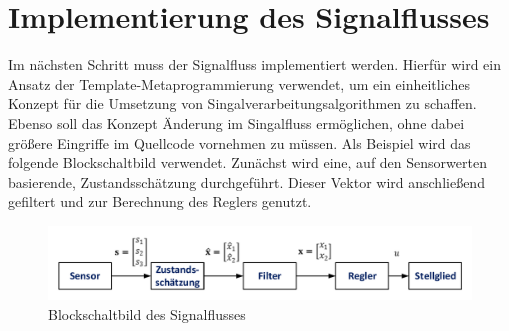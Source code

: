 \section{Implementierung des Signalflusses}
Im nächsten Schritt muss der Signalfluss implementiert werden. Hierfür wird ein Ansatz der Template-Metaprogrammierung verwendet, um ein einheitliches Konzept für die Umsetzung von Singalverarbeitungsalgorithmen zu schaffen. Ebenso soll das Konzept Änderung im Singalfluss ermöglichen, ohne dabei größere Eingriffe im Quellcode vornehmen zu müssen. Als Beispiel wird das folgende Blockschaltbild verwendet.
Zunächst wird eine, auf den Sensorwerten basierende, Zustandsschätzung durchgeführt. Dieser Vektor wird anschließend gefiltert und zur Berechnung des Reglers genutzt.
\begin{figure}[!h]
\centering
\includegraphics[width=\linewidth]{img/SW_1_Signalfluss_BSB.pdf}
\caption{Blockschaltbild des Signalflusses}
\end{figure}

